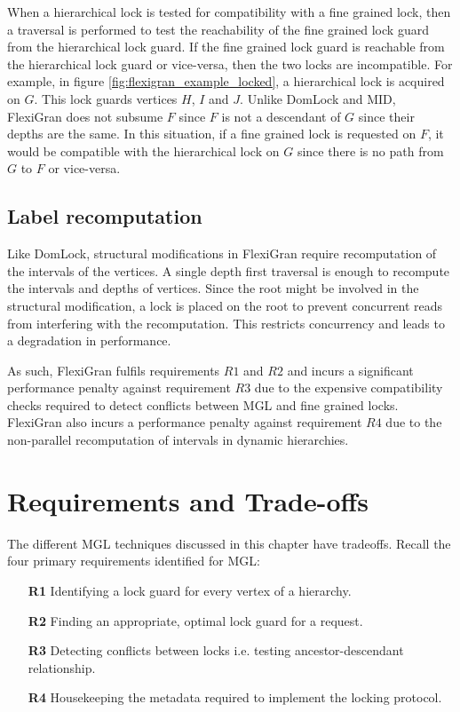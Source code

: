 When a hierarchical lock is tested for compatibility with a fine grained lock, then a traversal is performed to test the reachability of the fine grained lock guard from the hierarchical lock guard. If the fine grained lock guard is reachable from the hierarchical lock guard or vice-versa, then the two locks are incompatible. For example, in figure \ref{fig:flexigran_example_locked}, a hierarchical lock is acquired on $G$. This lock guards vertices $H$, $I$ and $J$. Unlike DomLock and MID, FlexiGran does not subsume $F$ since $F$ is not a descendant of $G$ since their depths are the same. In this situation, if a fine grained lock is requested on $F$, it would be compatible with the hierarchical lock on $G$ since there is no path from $G$ to $F$ or vice-versa.

\subsection{Label recomputation}
Like DomLock, structural modifications in FlexiGran require recomputation of the intervals of the vertices. A single depth first traversal is enough to recompute the intervals and depths of vertices. Since the root might be involved in the structural modification, a lock is placed on the root to prevent concurrent reads from interfering with the recomputation. This restricts concurrency and leads to a degradation in performance. 

As such, FlexiGran fulfils requirements $R1$ and $R2$ and incurs a significant performance penalty against requirement $R3$ due to the expensive compatibility checks required to detect conflicts between MGL and fine grained locks. FlexiGran also incurs a performance penalty against requirement $R4$ due to the non-parallel recomputation of intervals in dynamic hierarchies.


\section{Requirements and Trade-offs}
The different MGL techniques discussed in this chapter have tradeoffs. Recall the four primary requirements identified for MGL:
\begin{itemize}
    \item[\textbf{R1}] Identifying a lock guard for every vertex of a hierarchy.
    \item[\textbf{R2}] Finding an appropriate, optimal lock guard for a request.
    \item[\textbf{R3}] Detecting conflicts between locks i.e. testing ancestor-descendant relationship.
    \item[\textbf{R4}] Housekeeping the metadata required to implement the locking protocol.
\end{itemize}

